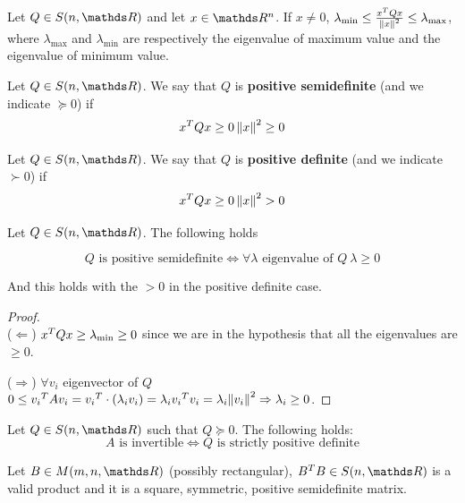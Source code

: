\documentclass[ComputationalMathematics.tex]{subfiles}
\begin{document}
\begin{corollary}
  Let $Q \in S(n, \R)$ and let $x \in \R^n$. If $x \neq 0$, $\lambda_{\text{min}} \le \frac{{x}^{T}Qx}{{\left\lVert x\right\rVert}^2} \le \lambda_{\text{max}}$, where $\lambda_{\text{max}}$ and $\lambda_{\text{min}}$ are respectively the eigenvalue of maximum value and the eigenvalue of minimum value.
\end{corollary}

\begin{definition}
  Let $Q \in S(n, \R)$. We say that $Q$ is \textbf{positive semidefinite} (and we indicate $\succeq 0$) if 
  \[
    {x}^{T} Q x \ge 0\left\lVert x\right\rVert^2 \geq 0
  \]
\end{definition}

\begin{definition}
   Let $Q \in S(n, \R)$. We say that $Q$ is \textbf{positive definite} (and we indicate $\succ 0$) if 
  \[
    {x}^{T} Q x \ge 0\left\lVert x\right\rVert^2 > 0
  \]
\end{definition}

\begin{proposition}
  Let $Q \in S(n, \R)$. The following holds
  
  \[
    Q \text{ is positive semidefinite} \iff \forall \lambda \text{ eigenvalue of } Q ~ \lambda \ge 0
  \]

  And this holds with the $>0$ in the positive definite case.
\end{proposition}

\begin{proof}~\\

  \indent ($\Leftarrow$) ${x}^{T} Q x \ge \lambda_{\text{min}} \geq 0$ since we are in the hypothesis that all the eigenvalues are $\geq 0$.

  \indent  ($\Rightarrow$) $ \forall v_i$ eigenvector of $Q$ $0 \le {v_i}^{T} A v_i = {v_i}^{T} \cdot ( \lambda_i v_i) = \lambda_i  {v_i}^{T} v_i = \lambda_i {\left\lVert v_i\right\rVert}^2 \Rightarrow \lambda_i \ge 0$.
\end{proof}

\begin{corollary}
  Let $Q \in S(n, \R)$ such that $Q \succeq 0$. The following holds:
  \[
    A \text{ is invertible} \iff Q \text{ is strictly positive definite}
  \]
\end{corollary}

\begin{proposition}
  Let $B \in M(m, n, \R)$ (possibly rectangular), $\tr{B} B \in S(n, \R)$ is a valid product and it is a square, symmetric, positive semidefinite matrix.
\end{proposition}
\end{document}
